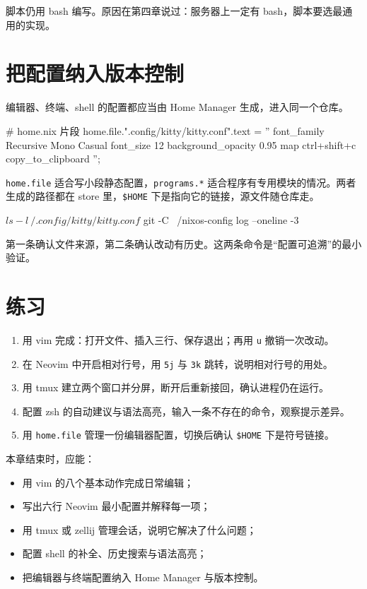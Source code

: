 脚本仍用 bash 编写。原因在第四章说过：服务器上一定有 bash，脚本要选最通用的实现。

\section{把配置纳入版本控制}

编辑器、终端、shell 的配置都应当由 Home Manager 生成，进入同一个仓库。

\begin{nixcode}
# home.nix 片段
home.file.".config/kitty/kitty.conf".text = ''
  font_family      Recursive Mono Casual
  font_size        12
  background_opacity 0.95
  map ctrl+shift+c copy_to_clipboard
'';
\end{nixcode}

\texttt{home.file} 适合写小段静态配置，\texttt{programs.*} 适合程序有专用模块的情况。两者生成的路径都在 store 里，\texttt{\$HOME} 下是指向它的链接，源文件随仓库走。

\begin{shellsession}
$ ls -l ~/.config/kitty/kitty.conf
$ git -C ~/nixos-config log --oneline -3
\end{shellsession}

第一条确认文件来源，第二条确认改动有历史。这两条命令是“配置可追溯”的最小验证。

\section{练习}

\begin{enumerate}
  \item 用 vim 完成：打开文件、插入三行、保存退出；再用 \texttt{u} 撤销一次改动。
  \item 在 Neovim 中开启相对行号，用 \texttt{5j} 与 \texttt{3k} 跳转，说明相对行号的用处。
  \item 用 tmux 建立两个窗口并分屏，断开后重新接回，确认进程仍在运行。
  \item 配置 zsh 的自动建议与语法高亮，输入一条不存在的命令，观察提示差异。
  \item 用 \texttt{home.file} 管理一份编辑器配置，切换后确认 \texttt{\$HOME} 下是符号链接。
\end{enumerate}

\begin{checkpoint}
本章结束时，应能：
\begin{itemize}
  \item 用 vim 的八个基本动作完成日常编辑；
  \item 写出六行 Neovim 最小配置并解释每一项；
  \item 用 tmux 或 zellij 管理会话，说明它解决了什么问题；
  \item 配置 shell 的补全、历史搜索与语法高亮；
  \item 把编辑器与终端配置纳入 Home Manager 与版本控制。
\end{itemize}
\end{checkpoint}

